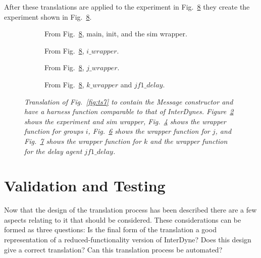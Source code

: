 \documentclass{article}
\begin{document}
After these translations are applied to the experiment in Fig.~\ref{fig:ts8} they create the experiment shown in Fig.~\ref{fig:ts8}.
\begin{figure}[H]
	\centering
	\begin{subfigure}[b]{1\textwidth}
	
	\caption{From Fig.~\ref{fig:ts8}, main, init, and the sim wrapper.  }
        \label{fig:ts81}
	\end{subfigure}
	\caption*{}
\end{figure}
	
\begin{figure}[H]\ContinuedFloat
	\centering
	\begin{subfigure}[b]{1\textwidth}
	
	\caption{From Fig.~\ref{fig:ts8}, $i\_wrapper$.  }
        \label{fig:ts82}
	\end{subfigure}
	\caption*{}
\end{figure}

\begin{figure}[H]\ContinuedFloat
	\centering
	\begin{subfigure}[b]{1\textwidth}
	
	\caption{From Fig.~\ref{fig:ts8}, $j\_wrapper$.  }
        \label{fig:ts83}
	\end{subfigure}
	\caption*{}
\end{figure}
	
\begin{figure}[H]\ContinuedFloat
	\centering
	\begin{subfigure}[b]{1\textwidth}
	
	\caption{From Fig.~\ref{fig:ts8}, $k\_wrapper$ and $jf1\_delay$.  }
        \label{fig:ts84}
	\end{subfigure}
	\caption{\it Translation of Fig.~\ref{fig:ts7} to contain the Message constructor and have a harness function comparable to that of InterDynes. Figure~\ref{fig:ts81} shows the experiment and sim wrapper, Fig.~\ref{fig:ts82} shows the wrapper function for groups $i$, Fig.~\ref{fig:ts83} shows the wrapper function for $j$, and Fig.~\ref{fig:ts84} shows the wrapper function for $k$ and the wrapper function for the delay agent $jf1\_delay$.}
	\label{fig:ts8}
\end{figure} 


\newpage
\section{Validation and Testing}
Now that the design of the translation process has been described there are a few aspects relating to it that should be considered. These considerations can be formed as three questions: Is the final form of the translation a good representation of a reduced-functionality version of InterDyne? Does this design give a correct translation? Can this translation process be automated?   
\end{document}
